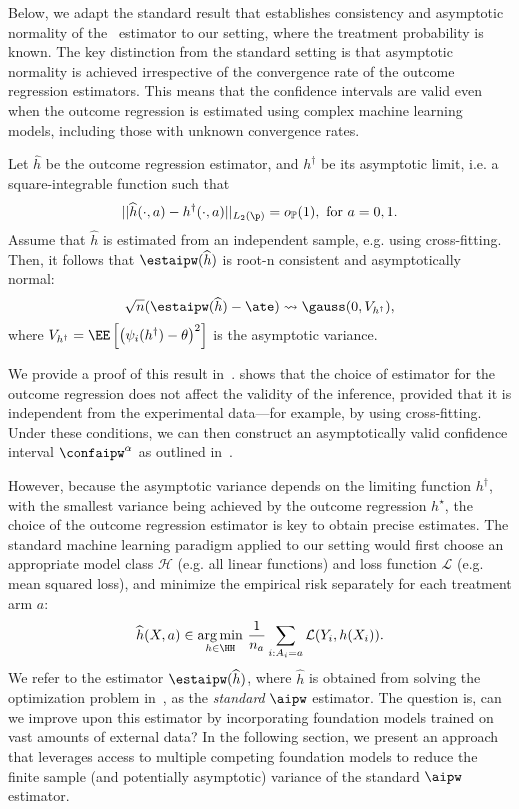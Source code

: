 Below, we adapt the standard result that establishes consistency and asymptotic normality of the \aipw~estimator to our setting, where the treatment probability 
 is known. The key distinction from the standard setting is that asymptotic normality is achieved irrespective of the convergence rate of the outcome regression  estimators. This means that the confidence intervals are valid even when the outcome regression is estimated using complex machine learning models, including those with unknown convergence rates.
\begin{proposition} \label{prop:rootn} Let $\widehat h$ be the outcome regression estimator, and $h^\dagger$ be its asymptotic limit, i.e. a square-integrable function such that  
$$
||\widehat h(\cdot, a) - h^\dagger(\cdot, a)||_{L_2(\p)} = o_{\mathbb P}(1),~\text{for}~ a=0,1.
$$
Assume that $\widehat h$ is estimated from an independent sample, e.g. using cross-fitting.
Then, it follows that $\estaipw(\widehat h)$ is root-n consistent and asymptotically normal:
$$
 \sqrt n (\estaipw(\widehat h)  - \ate) \rightsquigarrow \gauss(0, V_{h^\dagger}),$$
 where $V_{h^\dagger}=\EE\left[\left(\psi_i(h^\dagger)  - \theta \right)^2\right]$ is the asymptotic variance. 
\end{proposition}
We provide a proof of this result in~.
 shows that the choice of estimator for the outcome regression does not affect the validity of the inference, provided that it is independent  from the experimental data---for example, by using cross-fitting. Under these conditions, we can then construct an asymptotically valid confidence interval \(\confaipw^\alpha\) as outlined in~.  

However, because the asymptotic variance depends on the limiting function $h^\dagger$, with the smallest variance being achieved by the outcome regression $h^\star$, the choice of the outcome regression estimator is key to obtain precise estimates.  The standard machine learning paradigm applied to our setting would first choose an appropriate model class  $\mathcal H$ (e.g. all linear functions) and loss function $\mathcal L$ (e.g. mean squared loss), and
minimize the empirical risk separately for each treatment arm $a$:
\begin{align}
\label{eq:stdoutcome}
\widehat h(X,a) \in \underset{h \in \HH}{\arg\min}~\frac{1}{n_a} \sum_{i: A_i =a} \mathcal L(Y_i,h(X_i)).
\end{align}
We refer to the estimator $\estaipw(\widehat h)$, where $\widehat h$ is obtained from solving the optimization problem in~, as the \emph{standard} $\aipw$ estimator. The question is, can we improve upon this estimator by incorporating foundation models trained on vast amounts of external data? In the following section, we present an approach that leverages access to multiple competing foundation models to reduce the finite sample (and potentially asymptotic) variance of the standard $\aipw$ estimator.












